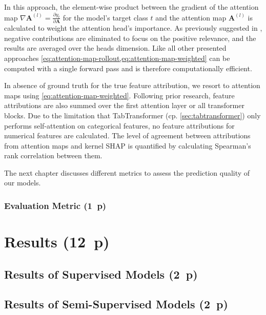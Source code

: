 In this approach, the element-wise product between the gradient of the attention map $\nabla \boldsymbol{A}^{(l)}=\frac{\partial y_t}{\partial \boldsymbol{A}}$ for the model's target class $t$ and the attention map $\boldsymbol{A}^{(l)}$ is calculated to weight the attention head's importance. As previously suggested in \textcite[][786]{cheferTransformerInterpretabilityAttention2021}, negative contributions are eliminated to focus on the positive relevance, and the results are averaged over the heads dimension. Like all other presented approaches \cref{eq:attention-map-rollout,eq:attention-map-weighted} can be computed with a single forward pass and is therefore computationally efficient.

In absence of ground truth for the true feature attribution, we resort to attention maps using \cref{eq:attention-map-weighted}. Following prior research, feature attributions are also summed over the first attention layer or all transformer blocks. Due to the limitation that TabTransformer (cp. \cref{sec:tabtransformer}) only performs self-attention on categorical features, no feature attributions for numerical features are calculated. The level of agreement between attributions from attention maps and kernel \gls{SHAP} is quantified by calculating Spearman's rank correlation between them.

The next chapter discusses different metrics to assess the prediction quality of our models.

\subsubsection{Evaluation Metric (1~p)}\label{sec:evaluation-metric}

\newpage
\section{Results (12~p)}\label{sec:results}

\subsection{Results of Supervised
    Models (2~p)}\label{sec:results-of-supervised-models}

\subsection{Results of Semi-Supervised
    Models (2~p)}\label{sec:results-of-semi-supervised-models}

